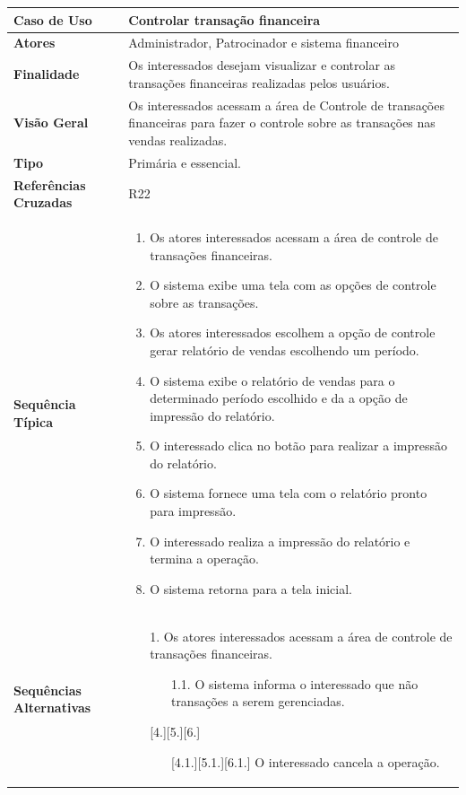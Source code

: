 \documentclass[a4paper,11pt]{article}
\begin{document}
\begin{table}[H]
		\begin{tabularx}{\textwidth}{|l|X|}
		\hline
			\textbf{Caso de Uso} &  Controlar transação financeira \\ \hline
			\textbf{Atores} &  Administrador, Patrocinador e sistema financeiro  \\ \hline
			\textbf{Finalidade} & Os interessados desejam visualizar e controlar as transações financeiras realizadas pelos usuários.  \\ \hline
			\textbf{Visão Geral} & Os interessados acessam a área de Controle de transações financeiras para fazer o controle sobre as transações nas vendas realizadas.   \\ \hline
			\textbf{Tipo} & Primária e essencial. \\ \hline
			\textbf{Referências Cruzadas} &  R22 \\ \hline
			\textbf{Sequência Típica} & 
			\begin{enumerate}
			\item Os atores interessados acessam a área de controle de transações financeiras.
			\item O sistema exibe uma tela com as opções de controle sobre as transações.
			\item Os atores interessados escolhem a opção de controle gerar relatório de vendas escolhendo um período.
			\item O sistema exibe o relatório de vendas para o determinado período escolhido e da a opção de impressão do relatório.
			\item O interessado clica no botão para realizar a impressão do relatório.
			\item O sistema fornece uma tela com o relatório pronto para impressão.
			\item O interessado realiza a impressão do relatório e termina a operação.
			\item O sistema retorna para a tela inicial.
			\end{enumerate} \\ \hline
			
			\textbf{Sequências Alternativas} & 
			\begin{itemize}
				\item[1.] Os atores interessados acessam a área de controle de transações financeiras.			
				\begin{itemize}
					\item[1.1.]O sistema informa o interessado que não transações a serem gerenciadas.
				\end{itemize}
				\item[][4.][5.][6.] 
				\begin{itemize}
					\item[][4.1.][5.1.][6.1.] O interessado cancela a operação.
				\end{itemize}
			\end{itemize} \\ \hline
		\end{tabularx}
\end{table}
\end{document}
